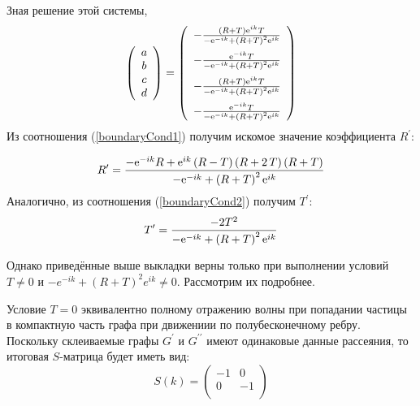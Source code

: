 \documentclass[a4 paper, 12 pt]{extarticle}
\begin{document}
   Зная решение этой системы,\[
   \left(\begin{array}{c}
   a \\
   b \\
   c \\
   d
   \end{array} \right) = 
   \left( \begin {array}{c} -{\frac { \left( R+T \right) {{\rm e}^{ik}}T
   	}{-{{\rm e}^{-ik}}+ \left(R+T\right)^2 {{\rm e}^{ik}
   }}}\\ \noalign{\medskip}-{\frac {{{\rm e}^{-ik}}T}{-{{\rm e}^{-ik}}+
   		\left(R+T\right)^2 {{\rm e}^{ik}}}}
   \\ \noalign{\medskip}-{\frac { \left( R+T \right) {{\rm e}^{ik}}T}{-{
   			{\rm e}^{-ik}}+ \left(R+T\right)^2 {{\rm e}^{ik}}}}
   \\ \noalign{\medskip}-{\frac {{{\rm e}^{-ik}}T}{-{{\rm e}^{-ik}}+
   		\left(R+T\right)^2 {{\rm e}^{ik}}}}\end {array}
   \right) 
   \]
   Из соотношения (\ref{boundaryCond1}) получим искомое значение коэффициента $R^\prime$:

   \[
   R^\prime = {\frac {-{{\rm e}^{-ik}}R+{{\rm e}^{ik}} \left( R-T \right)  \left( R+
   		2\,T \right)  \left( R+T \right) }{-{{\rm e}^{-ik}}+ \left( R+T\right)^2 {{\rm e}^{ik}}}}
   \]
   Аналогично, из соотношения (\ref{boundaryCond2}) получим $T^\prime$:
   \[
   T^\prime = {\frac {-2{T}^{2}}{-{{\rm e}^{-ik}}+ \left(R+T\right)^2 {{\rm e}^{ik}}}}
   \]
   
   Однако приведённые выше выкладки верны только при выполнении условий $T \neq 0$ и $-e^{-ik} + \left(R+T\right)^2 e^{ik} \neq 0$. Рассмотрим их подробнее.
   
   Условие $T = 0$ эквивалентно полному отражению волны при попадании частицы в компактную часть графа при движениии по полубесконечному ребру. Поскольку склеиваемые графы $G^\prime$ и $G^{\prime\prime}$ имеют одинаковые данные рассеяния, то итоговая $S$-матрица будет иметь вид:
   \[
   S(k)=\left(%
   \begin{array}{cc}
   -1 & 0 \\
   0 & -1 \\
   \end{array}%
   \right)
   \]
   
\end{document}
